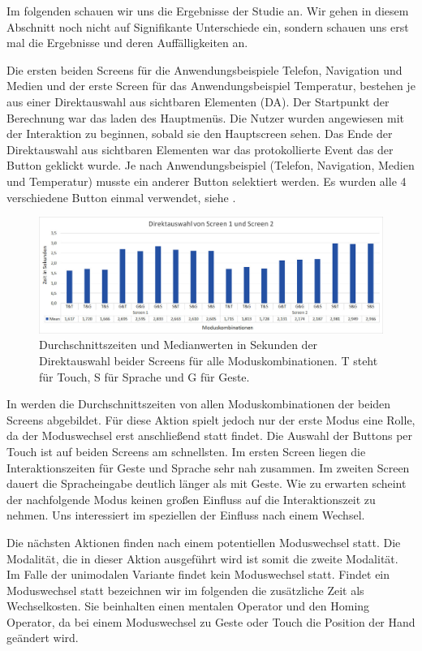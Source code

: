 Im folgenden schauen wir uns die Ergebnisse der Studie an. Wir gehen in diesem Abschnitt noch nicht auf Signifikante Unterschiede ein, sondern schauen uns erst mal die Ergebnisse und deren Auffälligkeiten an. 

Die ersten beiden Screens für die Anwendungsbeispiele Telefon, Navigation und Medien und der erste Screen für das Anwendungsbeispiel Temperatur, bestehen je aus einer Direktauswahl aus sichtbaren Elementen (DA). Der Startpunkt der Berechnung war das laden des Hauptmenüs. Die Nutzer wurden angewiesen mit der Interaktion zu beginnen, sobald sie den Hauptscreen sehen. Das Ende der Direktauswahl aus sichtbaren Elementen war das protokollierte Event das der Button geklickt wurde. Je nach Anwendungsbeispiel (Telefon, Navigation, Medien und Temperatur) musste ein anderer Button selektiert werden. Es wurden alle 4 verschiedene Button einmal verwendet, siehe .
\begin{figure}[ht]
  \centering
  \includegraphics[width=1\textwidth]{img/DA_Screen12.JPG}
  \caption[Durchschnittszeiten in Sekunden der Direktauswahl]{Durchschnittszeiten und Medianwerten in Sekunden der Direktauswahl beider Screens für alle Moduskombinationen. T steht für Touch, S für Sprache und G für Geste.}
  \label{fig:DA_Screen12}
\end{figure}
In  werden die Durchschnittszeiten von allen Moduskombinationen der beiden Screens abgebildet. Für diese Aktion spielt jedoch nur der erste Modus eine Rolle, da der Moduswechsel erst anschließend statt findet. Die Auswahl der Buttons per Touch ist auf beiden Screens am schnellsten. Im ersten Screen liegen die Interaktionszeiten für Geste und Sprache sehr nah zusammen. Im zweiten Screen dauert die Spracheingabe deutlich länger als mit Geste.
Wie zu erwarten scheint der nachfolgende Modus keinen großen Einfluss auf die Interaktionszeit zu nehmen. Uns interessiert im speziellen der Einfluss nach einem Wechsel. 

Die nächsten Aktionen finden nach einem potentiellen Moduswechsel statt. Die Modalität, die in dieser Aktion ausgeführt wird ist somit die zweite Modalität. Im Falle der unimodalen Variante findet kein Moduswechsel statt. Findet ein Moduswechsel statt bezeichnen wir im folgenden die zusätzliche Zeit als Wechselkosten. Sie beinhalten einen mentalen Operator und den Homing Operator, da bei einem Moduswechsel zu Geste oder Touch die Position der Hand geändert wird.

